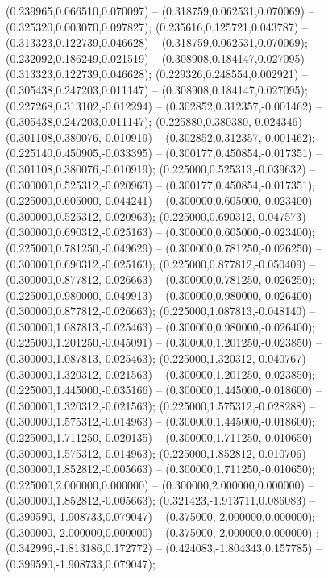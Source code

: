  (0.239965,0.066510,0.070097) -- (0.318759,0.062531,0.070069) -- (0.325320,0.003070,0.097827);
 (0.235616,0.125721,0.043787) -- (0.313323,0.122739,0.046628) -- (0.318759,0.062531,0.070069);
 (0.232092,0.186249,0.021519) -- (0.308908,0.184147,0.027095) -- (0.313323,0.122739,0.046628);
 (0.229326,0.248554,0.002921) -- (0.305438,0.247203,0.011147) -- (0.308908,0.184147,0.027095);
 (0.227268,0.313102,-0.012294) -- (0.302852,0.312357,-0.001462) -- (0.305438,0.247203,0.011147);
 (0.225880,0.380380,-0.024346) -- (0.301108,0.380076,-0.010919) -- (0.302852,0.312357,-0.001462);
 (0.225140,0.450905,-0.033395) -- (0.300177,0.450854,-0.017351) -- (0.301108,0.380076,-0.010919);
 (0.225000,0.525313,-0.039632) -- (0.300000,0.525312,-0.020963) -- (0.300177,0.450854,-0.017351);
 (0.225000,0.605000,-0.044241) -- (0.300000,0.605000,-0.023400) -- (0.300000,0.525312,-0.020963);
 (0.225000,0.690312,-0.047573) -- (0.300000,0.690312,-0.025163) -- (0.300000,0.605000,-0.023400);
 (0.225000,0.781250,-0.049629) -- (0.300000,0.781250,-0.026250) -- (0.300000,0.690312,-0.025163);
 (0.225000,0.877812,-0.050409) -- (0.300000,0.877812,-0.026663) -- (0.300000,0.781250,-0.026250);
 (0.225000,0.980000,-0.049913) -- (0.300000,0.980000,-0.026400) -- (0.300000,0.877812,-0.026663);
 (0.225000,1.087813,-0.048140) -- (0.300000,1.087813,-0.025463) -- (0.300000,0.980000,-0.026400);
 (0.225000,1.201250,-0.045091) -- (0.300000,1.201250,-0.023850) -- (0.300000,1.087813,-0.025463);
 (0.225000,1.320312,-0.040767) -- (0.300000,1.320312,-0.021563) -- (0.300000,1.201250,-0.023850);
 (0.225000,1.445000,-0.035166) -- (0.300000,1.445000,-0.018600) -- (0.300000,1.320312,-0.021563);
 (0.225000,1.575312,-0.028288) -- (0.300000,1.575312,-0.014963) -- (0.300000,1.445000,-0.018600);
 (0.225000,1.711250,-0.020135) -- (0.300000,1.711250,-0.010650) -- (0.300000,1.575312,-0.014963);
 (0.225000,1.852812,-0.010706) -- (0.300000,1.852812,-0.005663) -- (0.300000,1.711250,-0.010650);
 (0.225000,2.000000,0.000000) -- (0.300000,2.000000,0.000000) -- (0.300000,1.852812,-0.005663);
 (0.321423,-1.913711,0.086083) -- (0.399590,-1.908733,0.079047) -- (0.375000,-2.000000,0.000000);
 (0.300000,-2.000000,0.000000) -- (0.375000,-2.000000,0.000000) ;
 (0.342996,-1.813186,0.172772) -- (0.424083,-1.804343,0.157785) -- (0.399590,-1.908733,0.079047);
